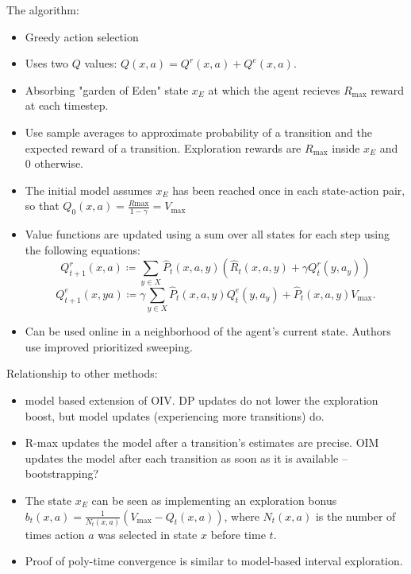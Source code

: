 \documentclass[12pt, oneside]{amsart}
\begin{document}
The algorithm:
\begin{itemize}
	\item Greedy action selection
	\item Uses two $Q$ values: $Q(x,a) = Q^r(x,a) + Q^e(x,a)$.
	\item Absorbing "garden of Eden" state $x_E$ at which the agent recieves $R_{\text{max}}$ reward at each timestep.
	\item Use sample averages to approximate probability of a transition and the expected reward of a transition. Exploration rewards are $R_{\text{max}}$ inside $x_E$ and $0$ otherwise.
	\item The initial model assumes $x_E$ has been reached once in each state-action pair, so that $Q_0(x, a) = \frac{R{\text{max}}}{1-\gamma} = V_{\text{max}}$
	\item Value functions are updated using a sum over all states for each step using the following equations:
	$$Q_{t+1}^r (x,a) \coloneqq \sum_{y \in X} \hat{P}_t(x,a,y)\left(\hat{R}_t(x,a,y) + \gamma Q_t^r(y, a_y)\right)$$
	$$Q^e_{t+1}(x,ya) \coloneqq \gamma \sum_{y\in X} \hat{P}_t(x,a,y)Q_t^e(y, a_y) + \hat{P}_t(x,a,y)V_{\text{max}}.$$
	\item Can be used online in a neighborhood of the agent's current state. Authors use improved prioritized sweeping.
\end{itemize}

Relationship to other methods:
\begin{itemize}
	\item model based extension of OIV. DP updates do not lower the exploration boost, but model updates (experiencing more transitions) do.
	\item R-max updates the model after a transition's estimates are precise. OIM updates the model after each transition as soon as it is available -- bootstrapping?
	\item The state $x_E$ can be seen as implementing an exploration bonus $b_t(x,a) = \frac{1}{N_t(x,a)}\left(V_{\text{max}} - Q_t(x,a)\right)$, where $N_t(x,a)$ is the number of times action $a$ was selected in state $x$ before time $t$.
	\item Proof of poly-time convergence is similar to model-based interval exploration.
\end{itemize}
\end{document}

